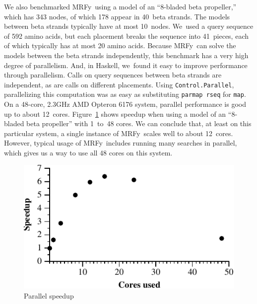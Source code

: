 \documentclass[preprint,nonatbib,blockstyle,times]{sigplanconf}
\newcommand\mrfy{MRFy} %
\newcommand\figref[1]{Figure~\ref{#1}}
\begin{document}
We also benchmarked \mrfy\ using a model of an ``8-bladed beta propeller,''
which has 343 nodes, of which 178 appear in 40~beta strands.
The models between beta strands typically have at most 10~nodes.
We~used a query sequence of 592 amino acids, but each placement breaks
the sequence into 41~pieces, each of which typically has at most 20 amino
acids.
Because \mrfy\ can solve the models between the beta strands independently,
this benchmark has a very high degree of parallelism.
And, in Haskell, we~found it easy
to improve performance through parallelism.
Calls on query sequences between beta strands are independent,
as are calls on different placements.
Using
\texttt{Control.Parallel}, parallelizing this computation was as easy
as  substituting
\texttt{parmap rseq} for \texttt{map}.
On a 48-core, 2.3GHz AMD Opteron 6176 system, 
parallel performance is good up to about 12~cores.
\figref{fig:speedup} shows speedup when
using a model of an ``8-bladed beta propeller'' with 1~to~48 cores.
We can conclude that, at least on this particular system,
a single instance of \mrfy\ scales well to about 12~cores.
However, typical usage of \mrfy\ includes running many searches
in parallel, which gives us a way to use all 48 cores on this system.





\begin{figure}%
\centerline{\includegraphics{speedup}}
\medskip
\caption{Parallel speedup}
\label{fig:speedup}
\end{figure}

%
\end{document}
